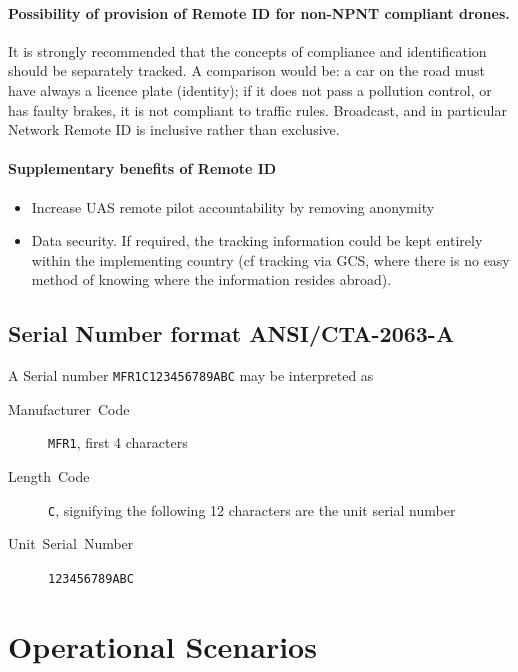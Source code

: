 \documentclass{ua_wgs_base}
\begin{document}
\paragraph{Possibility of provision of Remote ID for non-NPNT compliant drones.}

It is strongly recommended that the concepts of compliance and identification
should be separately tracked. A comparison would be: a car on the
road must have always a licence plate (identity); if it does not pass
a pollution control, or has faulty brakes, it is not compliant to
traffic rules. Broadcast, and in particular Network Remote ID is inclusive
rather than exclusive. 


\paragraph{Supplementary benefits of Remote ID}
\begin{itemize}
\item Increase UAS remote pilot accountability by removing anonymity
\item Data security. If required, the tracking information could be kept
entirely within the implementing country (cf tracking via GCS, where
there is no easy method of knowing where the information resides abroad).
\end{itemize}


\subsection{Serial Number format ANSI/CTA-2063-A\label{subsec:ANSI-CTA-2063-A}}

A Serial number \texttt{MFR1C123456789ABC} may be interpreted as 
\begin{description}
\item [{Manufacturer~Code}] \texttt{MFR1}, first 4 characters
\item [{Length~Code}] \texttt{C}, signifying the following 12 characters
are the unit serial number
\item [{Unit~Serial~Number}] \texttt{123456789ABC}
\end{description}

\section{Operational Scenarios\label{sec:OpScenarios}}
\end{document}
